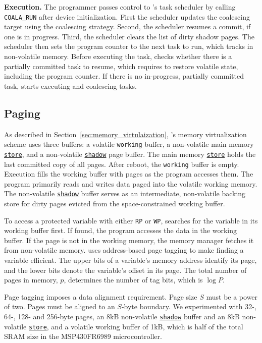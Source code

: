 \textbf{Execution.} The programmer passes control to \sys's task scheduler 
by calling \texttt{COALA\_RUN} after device initialization. 
%
First the scheduler updates the coalescing target using the coalescing
strategy.  Second, the scheduler resumes a commit, if one is in progress. Third,
the scheduler clears the list of dirty shadow pages. The scheduler then 
sets the program counter to the next task to run, which \sys tracks in  
non-volatile memory.  
%
Before executing the task, \sys checks whether there is a partially committed
task to resume, which requires \sys to restore volatile state, including the program
counter.  
%
If there is no in-progress, partially committed task, \sys starts executing and
coalescing tasks. 

\subsection{Paging}
\label{sec:impl:paging}

As described in Section~\ref{sec:memory_virtulaization}, \sys's memory
virtualization scheme uses three buffers: a volatile \texttt{working} buffer, a
non-volatile main memory \texttt{\underline{store}}, and a non-volatile
\texttt{\underline{shadow}} page buffer. 
%
The main memory \texttt{\underline{store}} holds the last committed copy of all 
pages. 
%
After reboot, the \texttt{working} buffer is empty. Execution fills 
the working buffer with pages as the program accesses them. 
%
The program primarily reads and writes data paged into the volatile working memory. 
%
The non-volatile \texttt{\underline{shadow}} buffer serves as an intermediate,
non-volatile backing store for dirty pages evicted from the space-constrained
working buffer. 

To access a protected variable with either \texttt{RP}
or \texttt{WP}, \sys searches for the variable in its working buffer first. If
found, the program accesses the data in the working buffer.  If the page is not 
in the working memory, the memory manager fetches it from non-volatile memory. 
%
\sys uses address-based page tagging to make finding a variable efficient.  The
upper bits of a variable's memory address identify its page, and the lower bits
denote the variable's offset in its page. The total number of pages in memory,
$p$, determines the number of tag bits, which is $\log P$.

Page tagging imposes a data alignment requirement.
Page size $S$ must be a power of two. 
%
Pages must be aligned to an $S$-byte boundary. 
%
We experimented with 32-, 64-, 128- and 256-byte pages, an 8kB non-volatile \texttt{\underline{shadow}} buffer and
an 8kB non-volatile \texttt{\underline{store}}, and a volatile working buffer
of 1kB, which is half of the total SRAM size in the MSP430FR6989 microcontroller.

